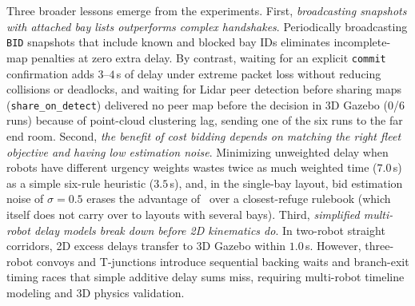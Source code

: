 Three broader lessons emerge from the experiments. First, \emph{broadcasting snapshots with attached bay lists outperforms complex handshakes}. Periodically broadcasting \texttt{BID} snapshots that include known and blocked bay IDs eliminates incomplete-map penalties at zero extra delay. By contrast, waiting for an explicit \texttt{commit} confirmation adds $3$--$4$\,s of delay under extreme packet loss without reducing collisions or deadlocks, and waiting for Lidar peer detection before sharing maps (\texttt{share\_on\_detect}) delivered no peer map before the decision in 3D Gazebo (0/6 runs) because of point-cloud clustering lag, sending one of the six runs to the far end room. Second, \emph{the benefit of cost bidding depends on matching the right fleet objective and having low estimation noise}. Minimizing unweighted delay when robots have different urgency weights wastes twice as much weighted time ($7.0$\,s) as a simple six-rule heuristic ($3.5$\,s), and, in the single-bay layout, bid estimation noise of $\sigma=0.5$ erases the advantage of \cb\ over a closest-refuge rulebook (which itself does not carry over to layouts with several bays). Third, \emph{simplified multi-robot delay models break down before 2D kinematics do}. In two-robot straight corridors, 2D excess delays transfer to 3D Gazebo within $1.0$\,s. However, three-robot convoys and T-junctions introduce sequential backing waits and branch-exit timing races that simple additive delay sums miss, requiring multi-robot timeline modeling and 3D physics validation.
